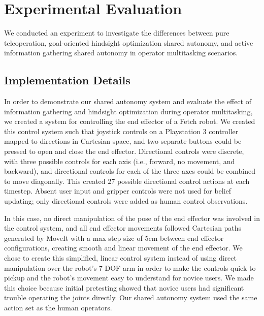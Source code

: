 \documentclass[conference]{IEEEtran}
\begin{document}
\section{Experimental Evaluation}

We conducted an experiment to investigate the differences between pure teleoperation, goal-oriented hindsight optimization shared autonomy, and active information gathering shared autonomy in operator multitasking scenarios.

\subsection{Implementation Details}\label{implementation}
In order to demonstrate our shared autonomy system and evaluate the effect of information gathering and hindsight optimization during operator multitasking, we created a system for controlling the end effector of a Fetch robot. We created this control system such that joystick controls on a Playstation 3 controller mapped to directions in Cartesian space, and two separate buttons could be pressed to open and close the end effector. Directional controls were discrete, with three possible controls for each axis (i.e., forward, no movement, and backward), and directional controls for each of the three axes could be combined to move diagonally. This created 27 possible directional control actions at each timestep. Absent user input and gripper controls were not used for belief updating; only directional controls were added as human control observations.


In this case, no direct manipulation of the pose of the end effector was involved in the control system, and all end effector movements followed Cartesian paths generated by MoveIt \cite{sucan2013moveit} with a max step size of 5cm between end effector configurations, creating smooth and linear movement of the end effector. We chose to create this simplified, linear control system instead of using direct manipulation over the robot's 7-DOF arm in order to make the controls quick to pickup and the robot's movement easy to understand for novice users. We made this choice because initial pretesting showed that novice users had significant trouble operating the joints directly. Our shared autonomy system used the same action set as the human operators.
\end{document}
